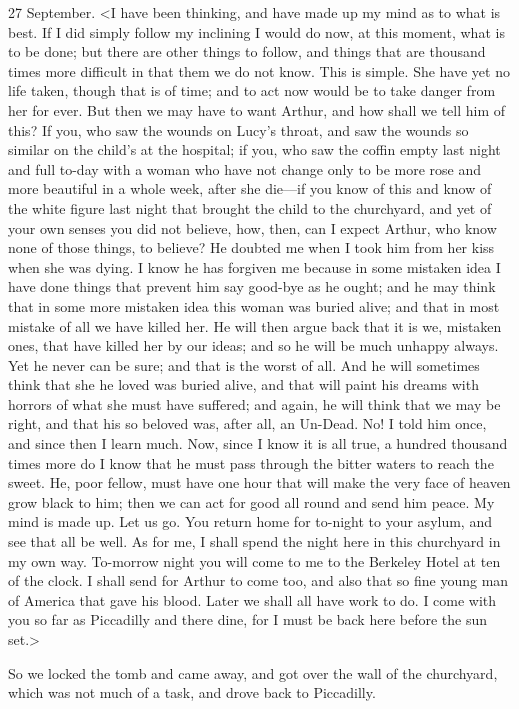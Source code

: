 \begin{diary}{27 September.}
<I have been thinking, and have made up my mind as to what is best. If I did simply follow my inclining I would do now, at this moment, what is to be done; but there are other things to follow, and things that are thousand times more difficult in that them we do not know. This is simple. She have yet no life taken, though that is of time; and to act now would be to take danger from her for ever. But then we may have to want Arthur, and how shall we tell him of this? If you, who saw the wounds on Lucy's throat, and saw the wounds so similar on the child's at the hospital; if you, who saw the coffin empty last night and full to-day with a woman who have not change only to be more rose and more beautiful in a whole week, after she die—if you know of this and know of the white figure last night that brought the child to the churchyard, and yet of your own senses you did not believe, how, then, can I expect Arthur, who know none of those things, to believe? He doubted me when I took him from her kiss when she was dying. I know he has forgiven me because in some mistaken idea I have done things that prevent him say good-bye as he ought; and he may think that in some more mistaken idea this woman was buried alive; and that in most mistake of all we have killed her. He will then argue back that it is we, mistaken ones, that have killed her by our ideas; and so he will be much unhappy always. Yet he never can be sure; and that is the worst of all. And he will sometimes think that she he loved was buried alive, and that will paint his dreams with horrors of what she must have suffered; and again, he will think that we may be right, and that his so beloved was, after all, an Un-Dead. No! I told him once, and since then I learn much. Now, since I know it is all true, a hundred thousand times more do I know that he must pass through the bitter waters to reach the sweet. He, poor fellow, must have one hour that will make the very face of heaven grow black to him; then we can act for good all round and send him peace. My mind is made up. Let us go. You return home for to-night to your asylum, and see that all be well. As for me, I shall spend the night here in this churchyard in my own way. To-morrow night you will come to me to the Berkeley Hotel at ten of the clock. I shall send for Arthur to come too, and also that so fine young man of America that gave his blood. Later we shall all have work to do. I come with you so far as Piccadilly and there dine, for I must be back here before the sun set.>

So we locked the tomb and came away, and got over the wall of the churchyard, which was not much of a task, and drove back to Piccadilly.

\end{diary}

